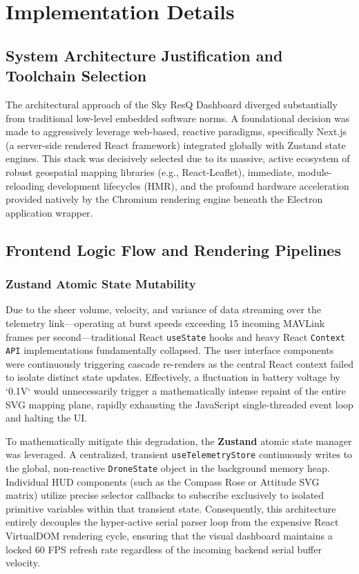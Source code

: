\chapter{Implementation Details}

\section{System Architecture Justification and Toolchain Selection}
The architectural approach of the Sky ResQ Dashboard diverged substantially from traditional low-level embedded software norms. A foundational decision was made to aggressively leverage web-based, reactive paradigms, specifically Next.js (a server-side rendered React framework) integrated globally with Zustand state engines. This stack was decisively selected due to its massive, active ecosystem of robust geospatial mapping libraries (e.g., React-Leaflet), immediate, module-reloading development lifecycles (HMR), and the profound hardware acceleration provided natively by the Chromium rendering engine beneath the Electron application wrapper.

\section{Frontend Logic Flow and Rendering Pipelines}
\subsection{Zustand Atomic State Mutability}
Due to the sheer volume, velocity, and variance of data streaming over the telemetry link—operating at burst speeds exceeding 15 incoming MAVLink frames per second—traditional React \texttt{useState} hooks and heavy React \texttt{Context API} implementations fundamentally collapsed. The user interface components were continuously triggering cascade re-renders as the central React context failed to isolate distinct state updates. Effectively, a fluctuation in battery voltage by `0.1V` would unnecessarily trigger a mathematically intense repaint of the entire SVG mapping plane, rapidly exhausting the JavaScript single-threaded event loop and halting the UI.

To mathematically mitigate this degradation, the \textbf{Zustand} atomic state manager was leveraged. A centralized, transient \texttt{useTelemetryStore} continuously writes to the global, non-reactive \texttt{DroneState} object in the background memory heap. Individual HUD components (such as the Compass Rose or Attitude SVG matrix) utilize precise selector callbacks to subscribe exclusively to isolated primitive variables within that transient state. Consequently, this architecture entirely decouples the hyper-active serial parser loop from the expensive React VirtualDOM rendering cycle, ensuring that the visual dashboard maintains a locked 60 FPS refresh rate regardless of the incoming backend serial buffer velocity.


